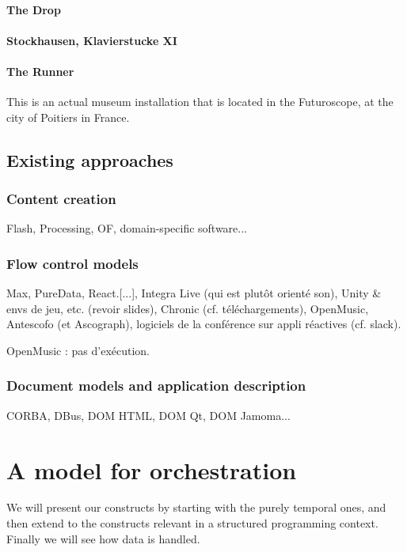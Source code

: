 \documentclass{sigchi}
\begin{document}
\paragraph{The Drop}
\paragraph{Stockhausen, Klavierstucke XI}
\paragraph{The Runner}
This is an actual museum installation that is located in the Futuroscope, at the city of Poitiers in France.

\subsection{Existing approaches}

\subsubsection{Content creation}
Flash, Processing, OF, domain-specific software...

\subsubsection{Flow control models}
Max, PureData, React.[...], Integra Live (qui est plutôt orienté son), Unity \& envs de jeu, etc. (revoir slides), Chronic (cf. téléchargements), OpenMusic, Antescofo (et Ascograph), logiciels de la conférence sur appli réactives (cf. slack).

OpenMusic : pas d'exécution.



\subsubsection{Document models and application description} %
CORBA, DBus, DOM HTML, DOM Qt, DOM Jamoma...


\section{A model for orchestration}
We will present our constructs by starting with the purely temporal ones, 
and then extend to the constructs relevant in a structured programming context.
Finally we will see how data is handled.
\end{document}
